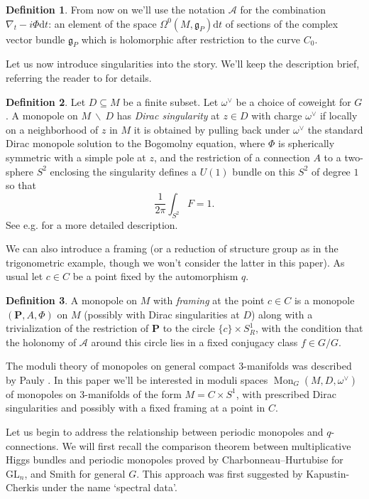 \documentclass[11pt, oneside, reqno]{amsart}
\theoremstyle{definition} \newtheorem{definition}{Definition}[section]
\theoremstyle{definition} \newtheorem{remark}[definition]{Remark}
\theoremstyle{definition} \newtheorem{remarks}[definition]{Remarks}
\theoremstyle{definition} \newtheorem{question}[definition]{Question}
\theoremstyle{definition} \newtheorem*{note}{Note}
\theoremstyle{definition} \newtheorem{example}[definition]{Example}
\theoremstyle{definition} \newtheorem{examples}[definition]{Examples}
\renewcommand{\gg}{\mathfrak{g}}
\newcommand{\mc}[1]{\mathcal{#1}}
\newcommand{\bo}[1]{\boldsymbol{#1}}
\newcommand{\bs}{\ \backslash \ }
\newcommand{\GL}{\mathrm{GL}}
\newcommand{\sub}{\subseteq}
\DeclareMathOperator{\mon}{Mon}
\renewcommand{\d}{\mathrm{d}}
\begin{document}
\begin{definition} 
From now on we'll use the notation $\mc A$ for the combination $\nabla_t - i\Phi \d t$: an element of the space $\Omega^0(M, \gg_P)\d t$ of sections of the complex vector bundle $\gg_P$ which is holomorphic after restriction to the curve $C_0$. 
\end{definition}

Let us now introduce singularities into the story.  We'll keep the description brief, referring the reader to \cite{CharbonneauHurtubise, Smith} for details.
\begin{definition}
Let $D \sub M$ be a finite subset.  Let $\omega^\vee$ be a choice of coweight for $G$.  A monopole on $M \bs D$ has \emph{Dirac singularity} at $z \in D$ with charge $\omega^\vee$ if locally on a neighborhood of $z$ in $M$ it is obtained by pulling back under $\omega^\vee$ the standard Dirac monopole solution to the Bogomolny equation, where $\Phi$ is spherically symmetric with a simple pole at $z$, and the restriction of a connection $A$ to a two-sphere $S^2$ enclosing the singularity defines a $U(1)$ bundle on this $S^2$ of degree $1$ so that
    \[\frac{1}{2\pi} \int_{S^2} F = 1 .\]
  See e.g. \cite[Section 2.2]{CharbonneauHurtubise} for a more detailed description.
\end{definition}

We can also introduce a framing (or a reduction of structure group as in the trigonometric example, though we won't consider the latter in this paper).  As usual let $c \in C$ be a point fixed by the automorphism $q$.
\begin{definition}
  A monopole on $M$ with \emph{framing} at the point $c \in C$ is a monopole $(\bo P,A,\Phi)$ on $M$ (possibly with Dirac singularities at $D$) along with a trivialization of the restriction of $\bo P$ to the circle $\{c\} \times S^1_R$, with the condition that the holonomy of $\mc A$ around this circle lies in a fixed conjugacy class $f \in G/G$.
\end{definition}

The moduli theory of monopoles on general compact 3-manifolds was described by Pauly \cite{Pauly}.  In this paper we'll be interested in moduli spaces $\mon_G(M, D, \omega^\vee)$ of monopoles on 3-manifolds of the form $M = C \times S^1$, with prescribed Dirac singularities and possibly with a fixed framing at a point in $C$.  

Let us begin to address the relationship between periodic monopoles and $q$-connections.  We will first recall the comparison theorem between multiplicative Higgs bundles and periodic monopoles proved by Charbonneau--Hurtubise \cite{CharbonneauHurtubise} for $\GL_n$, and Smith \cite{Smith} for general $G$. This approach was first suggested by Kapustin-Cherkis \cite{CherkisKapustin2} under the name `spectral data'. 
\end{document}
